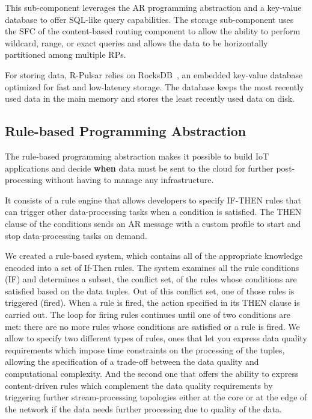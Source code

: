 This sub-component leverages the AR programming abstraction and a key-value database to offer SQL-like query capabilities. The storage sub-component uses the SFC of the content-based routing component to allow the ability to perform wildcard, range, or exact queries and allows the data to be horizontally partitioned among multiple RPs. 

For storing data, R-Pulsar relies on RocksDB~\cite{rocks}, an embedded key-value database optimized for fast and low-latency storage. The database keeps the most recently used data in the main memory and stores the least recently used data on disk.

\subsection{Rule-based Programming Abstraction}\label{sec:programming-data}
The rule-based programming abstraction makes it possible to build IoT applications and decide \textbf{when} data must be sent to the cloud for further post-processing without having to manage any infrastructure.

It consists of a rule engine that allows developers to specify IF-THEN rules that can trigger other data-processing tasks when a condition is satisfied. The THEN clause of the conditions sends an AR message with a custom profile to start and stop data-processing tasks on demand.

We created a rule-based system, which contains all of the appropriate knowledge encoded into a set of If-Then rules. The system examines all the rule conditions (IF) and determines a subset, the conflict set, of the rules whose conditions are satisfied based on the data tuples. Out of this conflict set, one of those rules is triggered (fired). When a rule is fired, the action specified in its THEN clause is carried out. The loop for firing rules continues until one of two conditions are met: there are no more rules whose conditions are satisfied or a rule is fired. We allow to specify two different types of rules, ones that let you express data quality requirements which impose time constraints on the processing of the tuples, allowing the specification of a trade-off between the data quality and computational complexity. And the second one that offers the ability to express content-driven rules which complement the data quality requirements by triggering further stream-processing topologies either at the core or at the edge of the network if the data needs further processing due to quality of the data.

